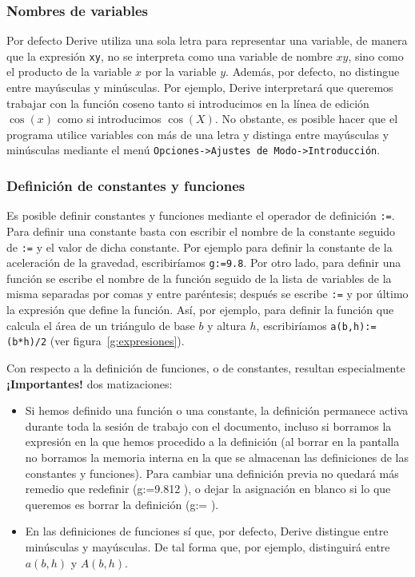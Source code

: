 \subsubsection*{Nombres de variables}
Por defecto Derive utiliza una sola letra para representar una
variable, de manera que la expresión \texttt{xy}, no se interpreta
como una variable de nombre $xy$, sino como el producto de la
variable $x$ por la variable $y$. Además, por defecto, no
distingue entre mayúsculas y minúsculas. Por ejemplo, Derive
interpretará que queremos trabajar con la función coseno tanto si
introducimos en la línea de edición $\cos(x)$ como si introducimos
$\cos(X)$. No obstante, es posible hacer que el programa utilice
variables con más de una letra y distinga entre mayúsculas y
minúsculas mediante el menú \texttt{Opciones->Ajustes de
Modo->Introducción}.

\subsubsection*{Definición de constantes y funciones}
Es posible definir constantes y funciones mediante el operador de
definición \texttt{:=}. Para definir una constante basta con
escribir el nombre de la constante seguido de \texttt{:=} y el
valor de dicha constante. Por ejemplo para definir la constante de
la aceleración de la gravedad, escribiríamos \texttt{g:=9.8}. Por
otro lado, para definir una función se escribe el nombre de la
función seguido de la lista de variables de la misma separadas por
comas y entre paréntesis; después se escribe \texttt{:=} y por
último la expresión que define la función. Así, por ejemplo, para
definir la función que calcula el área de un triángulo de base $b$
y altura $h$, escribiríamos \texttt{a(b,h):=(b*h)/2} (ver
figura~\ref{g:expresiones}).

Con respecto a la definición de funciones, o de constantes,
resultan especialmente \textbf{¡Importantes!} dos matizaciones:

\begin{itemize}

\item Si hemos definido una función o una constante, la definición
permanece activa durante toda la sesión de trabajo con el
documento, incluso si borramos la expresión en la que hemos
procedido a la definición (al borrar en la pantalla no borramos la
memoria interna en la que se almacenan las definiciones de las
constantes y funciones). Para cambiar una definición previa no
quedará más remedio que redefinir (g:=9.812 ), o dejar la
asignación en blanco si lo que queremos es borrar la definición
(g:= ).

\item En las definiciones de funciones sí que, por defecto, Derive
distingue entre minúsculas y mayúsculas. De tal forma que, por
ejemplo, distinguirá entre $a(b,h)$ y $A(b,h)$.

\end{itemize}

